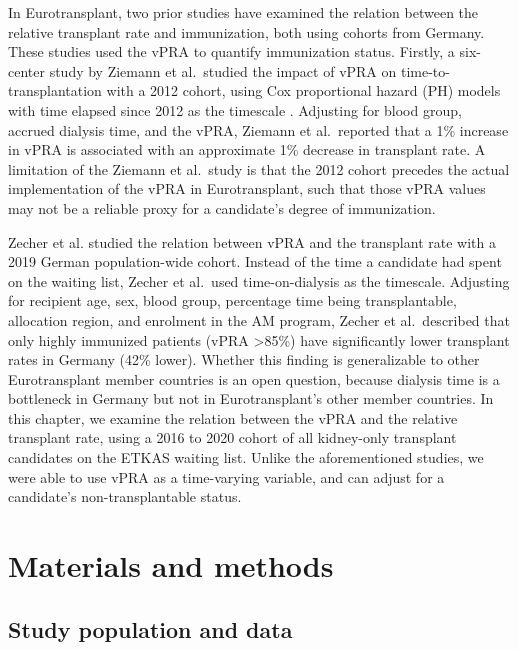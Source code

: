 \documentclass[11pt,twoside,]{book}
\begin{document}
In Eurotransplant, two prior studies have examined the relation between the relative
transplant rate and immunization, both using cohorts from Germany. These
studies used the vPRA to quantify immunization status. Firstly, a six-center
study by Ziemann et al.~studied the impact of vPRA on
time-to-transplantation with a 2012 cohort, using Cox proportional
hazard (PH) models with time elapsed since 2012 as the timescale
\citep{ziemannUnacceptableHumanLeucocyte2017}. Adjusting for blood group,
accrued dialysis time, and the vPRA, Ziemann et al.~reported that a 1\%
increase in vPRA is associated with an approximate 1\% decrease in
transplant rate. A limitation of the Ziemann et al.~study is that
the 2012 cohort precedes the actual implementation of the vPRA in Eurotransplant,
such that those vPRA values may not be a reliable proxy for a candidate's
degree of immunization.

Zecher et al. \citep{zecherImpactSensitizationWaiting2022a} studied the
relation between vPRA and the transplant rate with a 2019 German
population-wide cohort. Instead of the time a candidate had spent on the
waiting list, Zecher et al.~used time-on-dialysis as the timescale.
Adjusting for recipient age, sex, blood group, percentage time being
transplantable, allocation region, and enrolment in the AM program,
Zecher et al.~described that only highly immunized patients (vPRA \textgreater85\%) have
significantly lower transplant rates in Germany (42\% lower). Whether
this finding is generalizable to other Eurotransplant member countries is
an open question, because dialysis time is a bottleneck in Germany but not
in Eurotransplant's other member countries.
\newpage
In this chapter, we examine the relation between the vPRA
and the relative transplant rate, using a 2016 to 2020 cohort of
all kidney-only transplant candidates on the ETKAS waiting list. Unlike
the aforementioned studies, we were able to use vPRA as a time-varying variable,
and can adjust for a candidate's non-transplantable status.

\section{Materials and methods}\label{materials-and-methods-2}

\subsection{Study population and data}\label{study-population-and-data-1}
\end{document}
